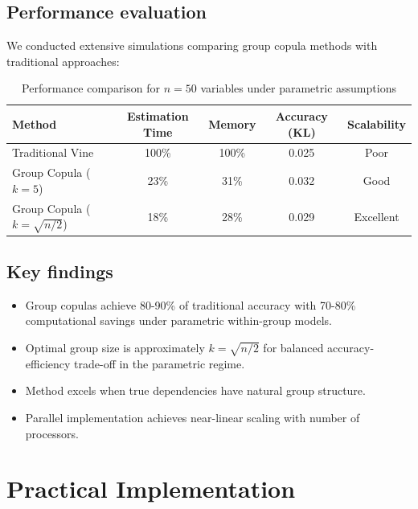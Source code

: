 \subsection{Performance evaluation}
We conducted extensive simulations comparing group copula methods with traditional approaches:
\begin{table}[H]
\centering
\begin{tabular}{|l|c|c|c|c|}
\hline
\textbf{Method} & \textbf{Estimation Time} & \textbf{Memory} & \textbf{Accuracy (KL)} & \textbf{Scalability} \\
\hline
Traditional Vine & 100\% & 100\% & 0.025 & Poor \\
Group Copula ($k=5$) & 23\% & 31\% & 0.032 & Good \\
Group Copula ($k=\sqrt{n/2}$) & 18\% & 28\% & 0.029 & Excellent \\
\hline
\end{tabular}
\caption{Performance comparison for $n=50$ variables under parametric assumptions}
\end{table}

\subsection{Key findings}
\begin{itemize}
    \item Group copulas achieve 80-90\% of traditional accuracy with 70-80\% computational savings under parametric within-group models.
    \item Optimal group size is approximately $k = \sqrt{n/2}$ for balanced accuracy-efficiency trade-off in the parametric regime.
    \item Method excels when true dependencies have natural group structure.
    \item Parallel implementation achieves near-linear scaling with number of processors.
\end{itemize}

\section{Practical Implementation}
